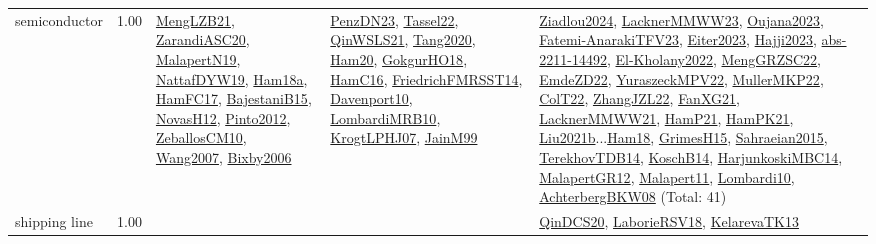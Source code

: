 {\begin{longtable}{p{3cm}r>{\raggedright\arraybackslash}p{6cm}>{\raggedright\arraybackslash}p{6cm}>{\raggedright\arraybackslash}p{8cm}}
\index{semiconductor}\index{ApplicationAreas!semiconductor}semiconductor &  1.00 & \hyperref[detail:MengLZB21]{MengLZB21}, \hyperref[detail:ZarandiASC20]{ZarandiASC20}, \hyperref[detail:MalapertN19]{MalapertN19}, \hyperref[detail:NattafDYW19]{NattafDYW19}, \hyperref[detail:Ham18a]{Ham18a}, \hyperref[detail:HamFC17]{HamFC17}, \hyperref[detail:BajestaniB15]{BajestaniB15}, \hyperref[detail:NovasH12]{NovasH12}, \hyperref[detail:Pinto2012]{Pinto2012}, \hyperref[detail:ZeballosCM10]{ZeballosCM10}, \hyperref[detail:Wang2007]{Wang2007}, \hyperref[detail:Bixby2006]{Bixby2006} & \hyperref[detail:PenzDN23]{PenzDN23}, \hyperref[detail:Tassel22]{Tassel22}, \hyperref[detail:QinWSLS21]{QinWSLS21}, \hyperref[detail:Tang2020]{Tang2020}, \hyperref[detail:Ham20]{Ham20}, \hyperref[detail:GokgurHO18]{GokgurHO18}, \hyperref[detail:HamC16]{HamC16}, \hyperref[detail:FriedrichFMRSST14]{FriedrichFMRSST14}, \hyperref[detail:Davenport10]{Davenport10}, \hyperref[detail:LombardiMRB10]{LombardiMRB10}, \hyperref[detail:KrogtLPHJ07]{KrogtLPHJ07}, \hyperref[detail:JainM99]{JainM99} & \hyperref[detail:Ziadlou2024]{Ziadlou2024}, \hyperref[detail:LacknerMMWW23]{LacknerMMWW23}, \hyperref[detail:Oujana2023]{Oujana2023}, \hyperref[detail:Fatemi-AnarakiTFV23]{Fatemi-AnarakiTFV23}, \hyperref[detail:Eiter2023]{Eiter2023}, \hyperref[detail:Hajji2023]{Hajji2023}, \hyperref[detail:abs-2211-14492]{abs-2211-14492}, \hyperref[detail:El-Kholany2022]{El-Kholany2022}, \hyperref[detail:MengGRZSC22]{MengGRZSC22}, \hyperref[detail:EmdeZD22]{EmdeZD22}, \hyperref[detail:YuraszeckMPV22]{YuraszeckMPV22}, \hyperref[detail:MullerMKP22]{MullerMKP22}, \hyperref[detail:ColT22]{ColT22}, \hyperref[detail:ZhangJZL22]{ZhangJZL22}, \hyperref[detail:FanXG21]{FanXG21}, \hyperref[detail:LacknerMMWW21]{LacknerMMWW21}, \hyperref[detail:HamP21]{HamP21}, \hyperref[detail:HamPK21]{HamPK21}, \hyperref[detail:Liu2021b]{Liu2021b}...\hyperref[detail:Ham18]{Ham18}, \hyperref[detail:GrimesH15]{GrimesH15}, \hyperref[detail:Sahraeian2015]{Sahraeian2015}, \hyperref[detail:TerekhovTDB14]{TerekhovTDB14}, \hyperref[detail:KoschB14]{KoschB14}, \hyperref[detail:HarjunkoskiMBC14]{HarjunkoskiMBC14}, \hyperref[detail:MalapertGR12]{MalapertGR12}, \hyperref[detail:Malapert11]{Malapert11}, \hyperref[detail:Lombardi10]{Lombardi10}, \hyperref[detail:AchterbergBKW08]{AchterbergBKW08} (Total: 41)\\
\index{shipping line}\index{ApplicationAreas!shipping line}shipping line &  1.00 &  &  & \hyperref[detail:QinDCS20]{QinDCS20}, \hyperref[detail:LaborieRSV18]{LaborieRSV18}, \hyperref[detail:KelarevaTK13]{KelarevaTK13}\\

\end{longtable}}
